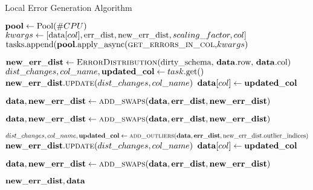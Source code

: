 \begin{algorithm}[!t]
    \caption{Local Error Generation Algorithm}\label{alg:local_generator}
    \begin{algorithmic}[1] 
	  
	  
	  \STATE $\mathbf{pool} \leftarrow \text{Pool}(\#CPU)$
	   {
	    \STATE $kwargs \leftarrow [\mathbf{\text{data}}[col], \mathbf{\text{err\_dist}}, \mathbf{\text{new\_err\_dist}}, scaling\_factor, col]$ 
        \STATE $\text{tasks.append(\ensuremath{\mathbf{pool}}.apply\_async(\textsc{get\_errors\_in\_col},} kwargs\text{)}$ 
      }\ENDFOR 
      
	  \STATE $\mathbf{new\_err\_dist} \leftarrow \text{\textsc{ErrorDistribution}(dirty\_schema, \ensuremath{\mathbf{data}}.row, \ensuremath{\mathbf{data}}.col)}$
	   {
        \STATE $dist\_changes, col\_name, \mathbf{updated\_col} \leftarrow task\text{.get()}$ 
        \STATE $\mathbf{new\_err\_dist}.\textsc{update}(dist\_changes, col\_name)$ 
        \STATE $\mathbf{data}[col] \leftarrow \mathbf{updated\_col}$ 
      }\ENDFOR 
      
      \STATE $\mathbf{data}, \mathbf{new\_err\_dist} \leftarrow \textsc{add\_swaps}(\mathbf{data}, \mathbf{err\_dist}, \mathbf{new\_err\_dist})$ 
      
      \STATE $\mathbf{data}, \mathbf{new\_err\_dist} \leftarrow \textsc{add\_swaps}(\mathbf{data}, \mathbf{err\_dist}, \mathbf{new\_err\_dist})$ 
      
       {
        \STATE $dist\_changes, col\_name, \mathbf{updated\_col} \leftarrow \textsc{add\_outliers}(\mathbf{data}, \mathbf{err\_dist}, \text{new\_err\_dist.outlier\_indices})$ 
        \STATE $\mathbf{new\_err\_dist}.\textsc{update}(dist\_changes, col\_name)$ 
        \STATE $\mathbf{data}[col] \leftarrow \mathbf{updated\_col}$ 
      }\ENDFOR 
      
      \STATE $\mathbf{data}, \mathbf{new\_err\_dist} \leftarrow \textsc{add\_swaps}(\mathbf{data}, \mathbf{err\_dist}, \mathbf{new\_err\_dist})$ 
      
      \RETURN $\mathbf{new\_err\_dist}, \mathbf{data}$
    \end{algorithmic}
\end{algorithm}


